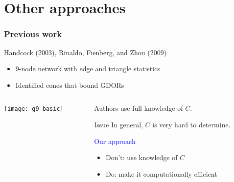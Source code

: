 \documentclass[ 10pt]{beamer}
\newcommand{\yobs}{y_{\text{obs}}}
\begin{document}
\section{Other approaches}
\frame
{
  \frametitle{Previous work}  
Handcock (2003), Rinaldo, Fienberg, and Zhou (2009)
\begin{itemize}
	\item 9-node network with edge and triangle statistics
	\item Identified cones that bound GDORs %
\end{itemize}

\begin{columns}[]
\begin{column}[T]{0.4\textwidth}
\texttt{[image: g9-basic]}
\end{column}

\begin{column}[t]{0.60\textwidth}
\vspace{1mm}

Authors use full knowledge of $C$.  

\vspace{2mm}

\pause
\begin{alertblock}{Issue}
In general, $C$ is very hard to determine.
\vspace{2mm}

\textcolor{blue}{Our approach}
\begin{itemize}
\item Don't: use knowledge of $C$
\item Do: \hspace{2.2mm}  make it computationally efficient
\vspace{2mm}
\end{itemize}
\vspace{2mm}
\end{alertblock}
\end{column}
\end{columns}


}
\end{document}
